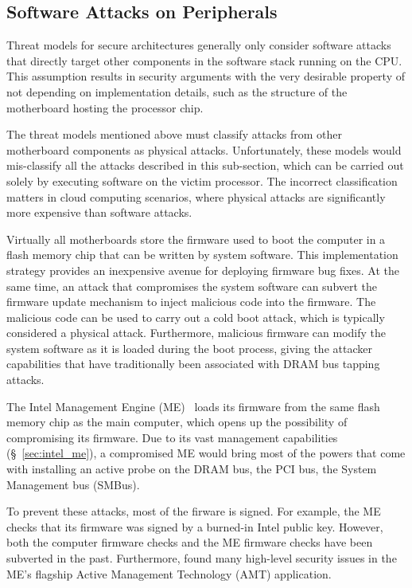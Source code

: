 \subsection{Software Attacks on Peripherals}
\label{sec:device_attacks}

Threat models for secure architectures generally only consider software attacks
that directly target other components in the software stack running on the CPU.
This assumption results in security arguments with the very desirable property
of not depending on implementation details, such as the structure of the
motherboard hosting the processor chip.

The threat models mentioned above must classify attacks from other motherboard
components as physical attacks. Unfortunately, these models would mis-classify
all the attacks described in this sub-section, which can be carried out solely
by executing software on the victim processor. The incorrect classification
matters in cloud computing scenarios, where physical attacks are significantly
more expensive than software attacks.

Virtually all motherboards store the firmware used to boot the computer in a
flash memory chip that can be written by system software. This implementation
strategy provides an inexpensive avenue for deploying firmware bug fixes. At
the same time, an attack that compromises the system software can subvert the
firmware update mechanism to inject malicious code into the firmware. The
malicious code can be used to carry out a cold boot attack, which is typically
considered a physical attack. Furthermore, malicious firmware can modify the
system software as it is loaded during the boot process, giving the attacker
capabilities that have traditionally been associated with DRAM bus tapping
attacks.

The Intel Management Engine (ME)~\cite{ruan2014intelme} loads its firmware
from the same flash memory chip as the main computer, which opens up the
possibility of compromising its firmware. Due to its vast management
capabilities (\S~\ref{sec:intel_me}), a compromised ME would bring most of the
powers that come with installing an active probe on the DRAM bus, the PCI bus,
the System Management bus (SMBus).

To prevent these attacks, most of the firware is signed. For example, the ME
checks that its firmware was signed by a burned-in Intel public key. However,
both the computer firmware checks \cite{wojtczuk2010bios, furtak2014bios} and
the ME firmware checks \cite{tereshkin2009amt} have been subverted in the past.
Furthermore, \cite{ververis2010security} found many high-level security issues
in the ME's flagship Active Management Technology (AMT) application.


